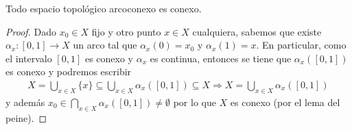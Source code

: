 \begin{teo}
    Todo espacio topológico arcoconexo es conexo.
    \begin{proof}
        Dado $x_0\in X$ fijo y otro punto $x\in X$ cualquiera, sabemos que existe $\alpha_x:[0,1]\to X$ un arco tal que $\alpha_x(0)=x_0$ y $\alpha_x(1)=x$. En particular, como el intervalo $[0,1]$ es conexo y $\alpha_x$ es continua, entonces se tiene que $\alpha_x([0,1])$ es conexo y podremos escribir 
        \begin{gather*}
            X=\bigcup\limits_{x\in X}\{x\}\subseteq \bigcup\limits_{x\in X} \alpha_x ([0,1])\subseteq X \Rightarrow X = \bigcup\limits_{x\in X}\alpha_x([0,1])
        \end{gather*}
        y además $x_0 \in \bigcap\limits_{x\in X}\alpha_x([0,1])\neq \emptyset$ por lo que $X$ es conexo (por el lema del peine).
    \end{proof}
\end{teo}


